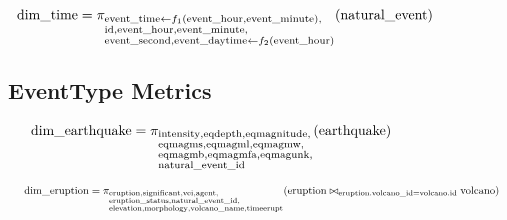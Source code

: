 \documentclass{article}
\begin{document}
\begin{align*}
\hspace{-1.4cm} \text{dim\_time} &= \pi_{\begin{subarray}{l}
                    \text{event\_time} \leftarrow  f_1(\text{event\_hour}, \text{event\_minute}), \\
                    \text{id}, 
                    \text{event\_hour}, 
                    \text{event\_minute}, \\
                    \text{event\_second}, 
                    \text{event\_daytime} \leftarrow  f_2(\text{event\_hour})
                   \end{subarray}} (\text{natural\_event})
\end{align*}

\subsection{EventType Metrics}

\begin{align*}
\hspace{-2.1cm} \text{dim\_earthquake} &= \pi_{\begin{subarray}{l}
                    \text{intensity}, 
                    \text{eqdepth}, 
                    \text{eqmagnitude}, \\
                    \text{eqmagms}, 
                    \text{eqmagml}, 
                    \text{eqmagmw}, \\
                    \text{eqmagmb}, 
                    \text{eqmagmfa}, 
                    \text{eqmagunk}, \\
                    \text{natural\_event\_id}
                   \end{subarray}} (\text{earthquake})
\end{align*}

\begin{align*}
\hspace{0.5cm}\text{dim\_eruption} &= \pi_{\begin{subarray}{l}
                    \text{eruption}, 
                    \text{significant}, 
                    \text{vei}, 
                    \text{agent}, \\
                    \text{eruption\_status}, 
                    \text{natural\_event\_id}, \\
                    \text{elevation}, 
                    \text{morphology}, 
                    \text{volcano\_name}, 
                    \text{timeerupt}
                   \end{subarray}} (\text{eruption} \bowtie_{\text{eruption.volcano\_id} = \text{volcano.id}} \text{volcano})
\end{align*}
\end{document}
